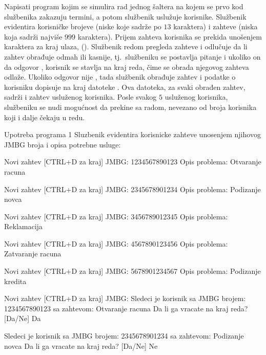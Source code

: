 \begin{Exercise}[label=606]
Napisati program kojim se simulira rad jednog šaltera na kojem se prvo kod službenika zakazuju 
termini, a potom službenik uslužuje korisnike. 
Službenik evidentira korisničke  brojeve (niske koje sadrže po $13$ karaktera) i zahteve (niska koja sadrži najviše $999$ karaktera). 
Prijem zahteva korisnika se prekida unošenjem karaktera za kraj ulaza, ().
Službenik redom pregleda zahteve i odlučuje da li zahtev obrađuje odmah ili kasnije, tj.~službeniku se postavlja pitanje 
 i ukoliko on da odgovor , 
korisnik se stavlja na kraj reda, čime se obrada njegovog zahteva odlaže. Ukoliko odgovor nije , tada službenik obrađuje zahtev i podatke o korisniku dopisuje na kraj datoteke . Ova datoteka, za svaki obrađen zahtev, sadrži  i zahtev usluženog korisnika.
Posle svakog $5$ usluženog korisnika, službeniku se nudi mogućnost da prekine sa radom, nevezano od broja korisnika koji i dalje čekaju u redu. 


\begin{maxitest}
\begin{test}{Upotreba programa 1}
Sluzbenik evidentira korisnicke zahteve unosenjem 
njihovog JMBG broja i opisa potrebne usluge:

Novi zahtev [CTRL+D za kraj]
        JMBG: 1234567890123
        Opis problema: Otvaranje racuna

Novi zahtev [CTRL+D za kraj]
        JMBG: 2345678901234
        Opis problema: Podizanje novca

Novi zahtev [CTRL+D za kraj]
        JMBG: 3456789012345
        Opis problema: Reklamacija

Novi zahtev [CTRL+D za kraj]
        JMBG: 4567890123456
        Opis problema: Zatvaranje racuna

Novi zahtev [CTRL+D za kraj]
        JMBG: 5678901234567
        Opis problema: Podizanje kredita

Novi zahtev [CTRL+D za kraj]
        JMBG: 
Sledeci je korisnik sa JMBG brojem: 1234567890123
sa zahtevom: Otvaranje racuna
        Da li ga vracate na kraj reda? [Da/Ne] Da

Sledeci je korisnik sa JMBG brojem: 2345678901234
sa zahtevom: Podizanje novca
        Da li ga vracate na kraj reda? [Da/Ne] Ne


\end{test}
\end{maxitest}
\end{Exercise}

